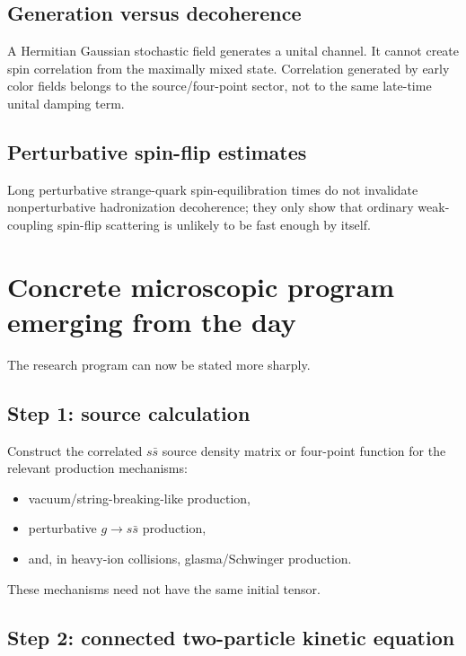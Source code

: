 \documentclass[11pt]{article}
\begin{document}
\subsection{Generation versus decoherence}

A Hermitian Gaussian stochastic field generates a unital channel. It cannot create spin correlation from the maximally mixed state. Correlation generated by early color fields belongs to the source/four-point sector, not to the same late-time unital damping term.

\subsection{Perturbative spin-flip estimates}

Long perturbative strange-quark spin-equilibration times do not invalidate nonperturbative hadronization decoherence; they only show that ordinary weak-coupling spin-flip scattering is unlikely to be fast enough by itself.

\section{Concrete microscopic program emerging from the day}

The research program can now be stated more sharply.

\subsection{Step 1: source calculation}

Construct the correlated $s\bar s$ source density matrix or four-point function for the relevant production mechanisms:

\begin{itemize}[leftmargin=1.5em]
\item vacuum/string-breaking-like production,
\item perturbative $g\to s\bar s$ production,
\item and, in heavy-ion collisions, glasma/Schwinger production.
\end{itemize}

These mechanisms need not have the same initial tensor.

\subsection{Step 2: connected two-particle kinetic equation}
\end{document}
